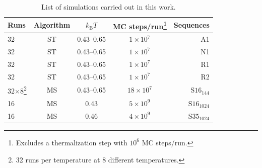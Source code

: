 \documentclass[
aip,
rsi,%
amsmath,amssymb,
reprint,%
]{revtex4-1}
\newcommand	 {\kb}		{{k_\mathrm{B}}}
\begin{document}
\begin{table}
\caption{\label{tab2} List of simulations carried out in this work. }
\begin{ruledtabular}
\begin{tabular}{lcccr}
Runs & Algorithm & $\kb T$  & MC steps/run\footnote{Excludes a thermalization step with $10^6$ MC steps/run.} &  Sequences\\
\hline
32 & ST & 0.43--0.65 & $1\times10^7$ &A1\\ 
32 & ST & 0.43--0.65 & $1\times10^7$ &N1\\ 
32 & ST & 0.43--0.65 & $1\times10^7$ &R1\\ 
32 & ST & 0.43--0.65 & $1\times10^7$ &R2\\ 
32$\times$8\footnote{32 runs per temperature at 8 different temperatures.} & MS &0.43--0.65& $18\times 10^7$ & $\mathrm{S16}_{144}$\\
16 & MS & 0.43  & $5\times 10^9$ &  $\mathrm{S16}_{1024}$ \\
16 & MS & 0.46 & $4\times 10^9$ &  $\mathrm{S35}_{1024}$ \\
\end{tabular}
\end{ruledtabular}
\end{table}
\end{document}

